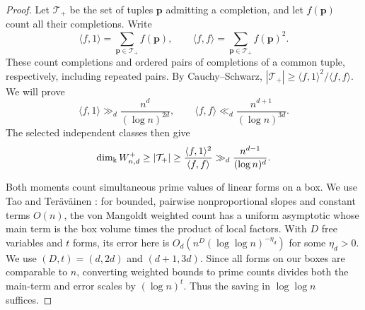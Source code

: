 \begin{proof}
Let $\mathcal T_+$ be the set of tuples $\boldsymbol p$ admitting
a completion, and let $f(\boldsymbol p)$ count all their completions.
Write
\[
 \langle f,1\rangle=\sum_{\boldsymbol p\in\mathcal T_+}f(\boldsymbol p),
 \qquad
 \langle f,f\rangle=\sum_{\boldsymbol p\in\mathcal T_+}f(\boldsymbol p)^2.
\]
These count completions and ordered pairs of completions of a common
tuple, respectively, including repeated pairs. By Cauchy--Schwarz,
$|\mathcal T_+|\ge\langle f,1\rangle^2/\langle f,f\rangle$.
We will prove
\begin{equation}\label{eq:shift-moments}
 \langle f,1\rangle\gg_d\frac{n^d}{(\log n)^{2d}},\qquad
 \langle f,f\rangle\ll_d\frac{n^{d+1}}{(\log n)^{3d}}.
\end{equation}
The selected independent classes then give
\[
 \dim_\Bbbk W^+_{n,d}\ge|\mathcal T_+|
 \ge\frac{\langle f,1\rangle^2}{\langle f,f\rangle}
 \gg_d\frac{n^{d-1}}{(\log n)^d}.
\]

Both moments count simultaneous prime values of linear forms on a
box. We use Tao and Ter\"av\"ainen \cite[Thm.~1.6]{TT}: for bounded,
pairwise nonproportional slopes and constant terms $O(n)$, the
von Mangoldt weighted count has a uniform asymptotic whose main term
is the box volume times the product of local factors.
With $D$ free variables and $t$ forms, its error here is
$O_d(n^D(\log\log n)^{-\eta_d})$ for some $\eta_d>0$.
We use $(D,t)=(d,2d)$ and $(d+1,3d)$.
Since all forms on our boxes are comparable to $n$, converting weighted
bounds to prime counts divides both the main-term and error scales by
$(\log n)^t$. Thus the saving in $\log\log n$ suffices.


\end{proof}
